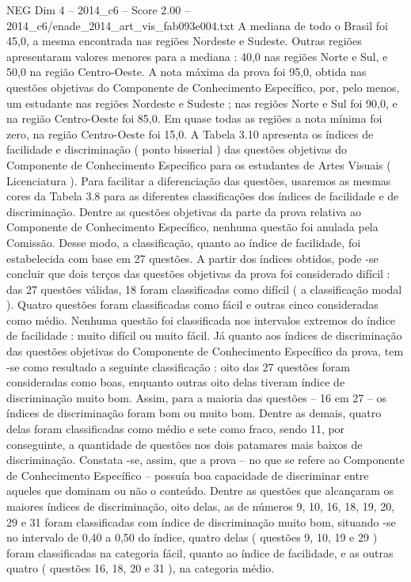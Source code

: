 \begin{textsample}{NEG Dim 4 – 2014\_c6 – Score 2.00 – 2014\_c6/enade\_2014\_art\_vis\_fab093e004.txt}
A mediana de todo o Brasil foi 45,0, a mesma encontrada nas regiões Nordeste e Sudeste.
Outras regiões apresentaram valores menores para a mediana : 40,0 nas regiões Norte e Sul, e 50,0 na região Centro-Oeste.
A nota máxima da prova foi 95,0, obtida nas questões objetivas do Componente de Conhecimento Específico, por, pelo menos, um estudante nas regiões Nordeste e Sudeste ; nas regiões Norte e Sul foi 90,0, e na região Centro-Oeste foi 85,0.
Em quase todas as regiões a nota mínima foi zero, na região Centro-Oeste foi 15,0.
A Tabela 3.10 apresenta os índices de facilidade e discriminação ( ponto bisserial ) das questões objetivas do Componente de Conhecimento Específico para os estudantes de Artes Visuais ( Licenciatura ).
Para facilitar a diferenciação das questões, usaremos as mesmas cores da Tabela 3.8 para as diferentes classificações dos índices de facilidade e de discriminação.
Dentre as questões objetivas da parte da prova relativa ao Componente de Conhecimento Específico, nenhuma questão foi anulada pela Comissão.
Desse modo, a classificação, quanto ao índice de facilidade, foi estabelecida com base em 27 questões.
A partir dos índices obtidos, pode -se concluir que dois terços das questões objetivas da prova foi considerado difícil : das 27 questões válidas, 18 foram classificadas como difícil ( a classificação modal ).
Quatro questões foram classificadas como fácil e outras cinco consideradas como médio.
Nenhuma questão foi classificada nos intervalos extremos do índice de facilidade : muito difícil ou muito fácil.
Já quanto aos índices de discriminação das questões objetivas do Componente de Conhecimento Específico da prova, tem -se como resultado a seguinte classificação : oito das 27 questões foram consideradas como boas, enquanto outras oito delas tiveram índice de discriminação muito bom.
Assim, para a maioria das questões – 16 em 27 – os índices de discriminação foram bom ou muito bom.
Dentre as demais, quatro delas foram classificadas como médio e sete como fraco, sendo 11, por conseguinte, a quantidade de questões nos dois patamares mais baixos de discriminação.
Constata -se, assim, que a prova – no que se refere ao Componente de Conhecimento Específico – possuía boa capacidade de discriminar entre aqueles que dominam ou não o conteúdo.
Dentre as questões que alcançaram os maiores índices de discriminação, oito delas, as de números 9, 10, 16, 18, 19, 20, 29 e 31 foram classificadas com índice de discriminação muito bom, situando -se no intervalo de 0,40 a 0,50 do índice, quatro delas ( questões 9, 10, 19 e 29 ) foram classificadas na categoria fácil, quanto ao índice de facilidade, e as outras quatro ( questões 16, 18, 20 e 31 ), na categoria médio.

\end{textsample}
